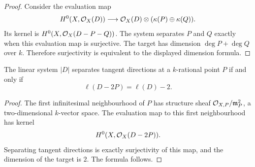\begin{proof}
Consider the evaluation map
\[
    H^0(X,\mathcal{O}_X(D))\longrightarrow
    \mathcal{O}_X(D)\otimes(\kappa(P)\oplus\kappa(Q)).
\]
Its kernel is \(H^0(X,\mathcal{O}_X(D-P-Q))\).  The system separates \(P\) and \(Q\)
exactly when this evaluation map is surjective.  The target has dimension
\(\deg P+\deg Q\) over \(k\).  Therefore surjectivity is equivalent to the
displayed dimension formula.
\end{proof}

\begin{proposition}
The linear system \(|D|\) separates tangent directions at a \(k\)-rational point
\(P\) if and only if
\[
    \ell(D-2P)=\ell(D)-2.
\]
\end{proposition}

\begin{proof}
The first infinitesimal neighbourhood of \(P\) has structure sheaf
\(\mathcal{O}_{X,P}/\mathfrak m_P^2\), a two-dimensional \(k\)-vector space.  The
evaluation map to this first neighbourhood has kernel
\[
    H^0(X,\mathcal{O}_X(D-2P)).
\]
Separating tangent directions is exactly surjectivity of this map, and the
dimension of the target is \(2\).  The formula follows.
\end{proof}
